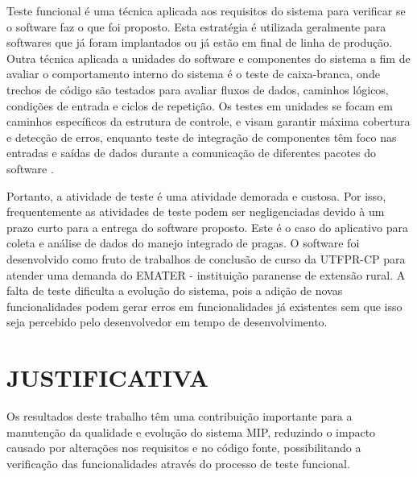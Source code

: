 Teste funcional é uma técnica aplicada aos requisitos do sistema para verificar se o software faz o que foi proposto. Esta estratégia é utilizada geralmente para softwares que já foram implantados ou já estão em final de linha de produção. Outra técnica aplicada a unidades do software e componentes do sistema a fim de avaliar o comportamento interno do sistema é o teste de caixa-branca, onde trechos de código são testados para avaliar fluxos de dados, caminhos lógicos, condições de entrada e ciclos de repetição. Os testes em unidades se focam em caminhos específicos da estrutura de controle, e visam garantir máxima cobertura e detecção de erros, enquanto teste de integração de componentes têm foco nas entradas e saídas de dados durante a comunicação de diferentes pacotes do software \cite{PRESMA2016}.  


Portanto, a atividade de teste é uma atividade demorada e custosa. Por isso, frequentemente as atividades de teste podem ser negligenciadas devido à um prazo curto para a entrega do software proposto. Este é o caso do aplicativo para coleta e análise de dados do manejo integrado de pragas. O software foi desenvolvido como fruto de trabalhos de conclusão de curso da UTFPR-CP para atender uma demanda do EMATER - instituição paranense de extensão rural. A falta de teste dificulta a evolução do sistema, pois a adição de novas funcionalidades podem gerar erros em funcionalidades já existentes sem que isso seja percebido pelo desenvolvedor em tempo de desenvolvimento. 

\section{JUSTIFICATIVA}

Os resultados deste trabalho têm uma contribuição importante para a manutenção da qualidade e evolução do sistema MIP, reduzindo o impacto causado por alterações nos requisitos e no código fonte, possibilitando a verificação das funcionalidades através do processo de teste funcional. 

